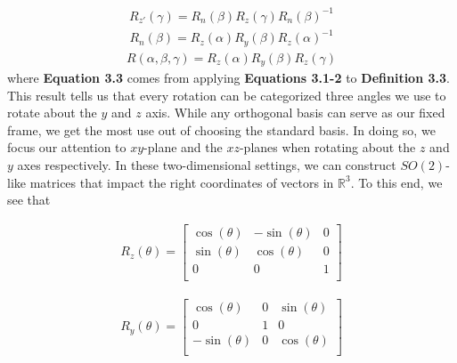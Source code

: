 \documentclass[10pt]{ucthesis}
\newcommand{\R}{\mathbb{R}}
\begin{document}
\begin{equation}
	\begin{aligned}
		R_{z'}(\gamma) = R_n(\beta)R_z(\gamma)R_n(\beta)^{-1}
	\end{aligned}
\end{equation}
\begin{equation}
	\begin{aligned}
		R_n(\beta) = R_z(\alpha)R_y(\beta)R_z(\alpha)^{-1}
	\end{aligned}
\end{equation}
\begin{equation}
	\begin{aligned}
		R(\alpha,\beta,\gamma) = R_z(\alpha)R_y(\beta)R_z(\gamma)
	\end{aligned}
\end{equation}
where \textbf{Equation 3.3} comes from applying \textbf{Equations 3.1-2} to \textbf{Definition 3.3}. This result tells us that every rotation can be categorized three angles we use to rotate about the $y$ and $z$ axis. While any orthogonal basis can serve as our fixed frame, we get the most use out of choosing the standard basis. In doing so, we focus our attention to $xy$-plane and the $xz$-planes when rotating about the $z$ and $y$ axes respectively. In these two-dimensional settings, we can construct $SO(2)$-like matrices that impact the right coordinates of vectors in $\R^3$. To this end, we see that

\begin{equation}
	\begin{aligned}
		R_z(\theta) = \begin{bmatrix}
						\cos(\theta) & -\sin(\theta) & 0 \\
						\sin(\theta) & \cos(\theta) & 0 \\
						0 & 0 & 1 \\
						\end{bmatrix}
	\end{aligned}
\end{equation}

\begin{equation}
	\begin{aligned}
		R_y(\theta) = \begin{bmatrix}
						\cos(\theta) & 0& \sin(\theta) \\
						0 & 1 & 0 \\
						-\sin(\theta) &0& \cos(\theta) \\
						\end{bmatrix}
	\end{aligned}
\end{equation}
\end{document}
